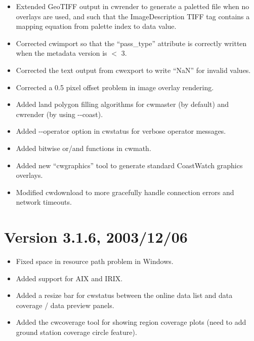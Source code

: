 \begin{itemize}

  \item Extended GeoTIFF output in cwrender to generate a paletted
  file when no overlays are used, and such that the ImageDescription
  TIFF tag contains a mapping equation from palette index to data
  value.

  \item Corrected cwimport so that the ``pass\_type'' attribute is
  correctly written when the metadata version is $<$ 3.

  \item Corrected the text output from cwexport to write ``NaN'' for
  invalid values.

  \item Corrected a 0.5 pixel offset problem in image overlay
  rendering.

  \item Added land polygon filling algorithms for cwmaster (by
  default) and cwrender (by using -{-}coast).

  \item Added -{-}operator option in cwstatus for verbose operator
  messages.

  \item Added bitwise or/and functions in cwmath.

  \item Added new ``cwgraphics'' tool to generate standard CoastWatch
  graphics overlays.

  \item Modified cwdownload to more gracefully handle connection
  errors and network timeouts.

\end{itemize}




\section*{Version 3.1.6, 2003/12/06}

\begin{itemize}

  \item Fixed space in resource path problem in Windows.

  \item Added support for AIX and IRIX.

  \item Added a resize bar for cwstatus between the online data list
  and data coverage / data preview panels.

  \item Added the cwcoverage tool for showing region coverage plots
  (need to add ground station coverage circle feature).

\end{itemize}


